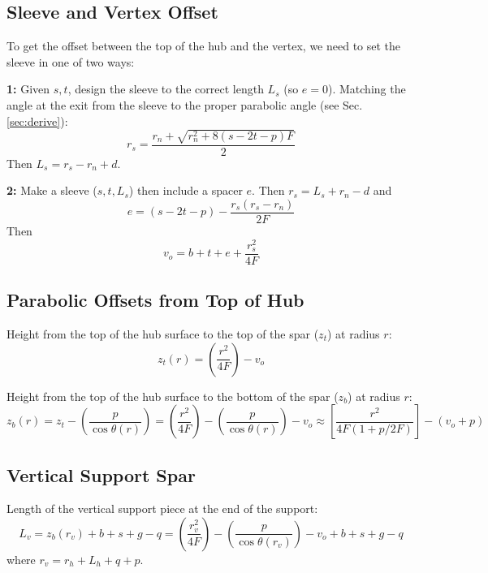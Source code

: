 \documentclass{article}
\begin{document}
\subsection{Sleeve and Vertex Offset}
To get the offset between the top of the hub and the vertex, we need to set the sleeve in one of two ways:

\vspace{.3in}
\noindent
{\bf 1:}  Given $s, t$, design the sleeve to the correct length $L_s$ (so $e=0$).
Matching the angle at the exit from the sleeve to the proper parabolic angle (see Sec. \ref{sec:derive}):
\begin{equation}
r_s = \frac{r_n + \sqrt{r_n^2 + 8(s - 2t - p)F}}{2}
\label{eq:sleeveExitAngle}
\end{equation}
Then $L_s = r_s - r_n + d$.

\vspace{0.2in}
\noindent
{\bf 2:}  Make a sleeve ($s, t, L_s$) then include a spacer $e$.  Then $r_s = L_s + r_n - d$ and 
\begin{equation}
e = (s - 2t - p) - \frac{r_s(r_s - r_n)}{2F}
\label{eq:spacer}
\end{equation}
\noindent
Then
\begin{equation}
v_o = b + t + e + \frac{r_s^2}{4F}
\end{equation}

\subsection{Parabolic Offsets from Top of Hub}
\noindent
Height from the top of the hub surface to the top of the spar ($z_t$) at radius $r$:
\begin{equation}
z_t(r) = \left(\frac{r^2}{4F}\right) - v_o
\end{equation}

\noindent
Height from the top of the hub surface to the bottom of the spar ($z_b$) at radius $r$:
\begin{equation}
z_b(r) = z_t - \left(\frac{p}{\cos\theta(r)}\right) = \left(\frac{r^2}{4F}\right) - \left(\frac{p}{\cos\theta(r)}\right) - v_o \approx \left[\frac{r^2}{4F(1+p/2F)}\right] - (v_o + p)
\end{equation}
 
\subsection{Vertical Support Spar}
\noindent
Length of the vertical support piece at the end of the support:
\begin{equation}
L_v = z_b(r_v) + b + s + g - q = \left(\frac{r_v^2}{4F}\right) - \left(\frac{p}{\cos\theta(r_v)}\right) - v_o + b + s + g - q
\end{equation}
where $r_v = r_h + L_h + q + p$.
\end{document}
